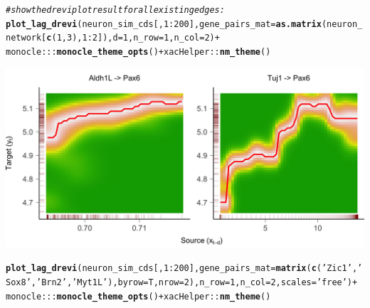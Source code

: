 \documentclass[10pt,oneside]{article}\usepackage[]{graphicx}\usepackage[]{color}
\makeatletter
\def\maxwidth{ %
  \ifdim\Gin@nat@width>\linewidth
    \linewidth
  \else
    \Gin@nat@width
  \fi
}
\newcommand{\hlnum}[1]{\textcolor[rgb]{0.686,0.059,0.569}{#1}}%
\newcommand{\hlstr}[1]{\textcolor[rgb]{0.192,0.494,0.8}{#1}}%
\newcommand{\hlcom}[1]{\textcolor[rgb]{0.678,0.584,0.686}{\textit{#1}}}%
\newcommand{\hlopt}[1]{\textcolor[rgb]{0,0,0}{#1}}%
\newcommand{\hlstd}[1]{\textcolor[rgb]{0.345,0.345,0.345}{#1}}%
\newcommand{\hlkwc}[1]{\textcolor[rgb]{0.333,0.667,0.333}{#1}}%
\newcommand{\hlkwd}[1]{\textcolor[rgb]{0.737,0.353,0.396}{\textbf{#1}}}%
\newenvironment{kframe}{%
 \def\at@end@of@kframe{}%
 \ifinner\ifhmode%
  \def\at@end@of@kframe{\end{minipage}}%
  \begin{minipage}{\columnwidth}%
 \fi\fi%
 \def\FrameCommand##1{\hskip\@totalleftmargin \hskip-\fboxsep
 \colorbox{shadecolor}{##1}\hskip-\fboxsep
     \hskip-\linewidth \hskip-\@totalleftmargin \hskip\columnwidth}%
 \MakeFramed {\advance\hsize-\width
   \@totalleftmargin\z@ \linewidth\hsize
   \@setminipage}}%
 {\par\unskip\endMakeFramed%
 \at@end@of@kframe}
\newenvironment{knitrout}{}{} %
\makeatother
\begin{document}
\begin{knitrout}
\color{fgcolor}\begin{kframe}
\begin{alltt}
\hlcom{# show the drevi plot result for all existing edges:}
\hlkwd{plot_lag_drevi}\hlstd{(neuron_sim_cds[,} \hlnum{1}\hlopt{:}\hlnum{200}\hlstd{],} \hlkwc{gene_pairs_mat} \hlstd{=} \hlkwd{as.matrix}\hlstd{(neuron_network[}\hlkwd{c}\hlstd{(}\hlnum{1}\hlstd{,} \hlnum{3}\hlstd{),} \hlnum{1}\hlopt{:}\hlnum{2}\hlstd{]),} \hlkwc{d} \hlstd{=} \hlnum{1}\hlstd{,} \hlkwc{n_row} \hlstd{=} \hlnum{1}\hlstd{,} \hlkwc{n_col} \hlstd{=} \hlnum{2}\hlstd{)} \hlopt{+}
  \hlstd{monocle}\hlopt{:::}\hlkwd{monocle_theme_opts}\hlstd{()} \hlopt{+} \hlstd{xacHelper}\hlopt{::}\hlkwd{nm_theme}\hlstd{()}
\end{alltt}
\end{kframe}

{\centering \includegraphics[width=\maxwidth]{figure/plot_drevi-1} 

}


\begin{kframe}\begin{alltt}
\hlkwd{plot_lag_drevi}\hlstd{(neuron_sim_cds[,} \hlnum{1}\hlopt{:}\hlnum{200}\hlstd{],} \hlkwc{gene_pairs_mat} \hlstd{=} \hlkwd{matrix}\hlstd{(}\hlkwd{c}\hlstd{(}\hlstr{'Zic1'}\hlstd{,} \hlstr{'Sox8'}\hlstd{,} \hlstr{'Brn2'}\hlstd{,} \hlstr{'Myt1L'}\hlstd{),} \hlkwc{byrow} \hlstd{= T,} \hlkwc{nrow} \hlstd{=} \hlnum{2}\hlstd{),} \hlkwc{n_row} \hlstd{=} \hlnum{1}\hlstd{,} \hlkwc{n_col} \hlstd{=} \hlnum{2}\hlstd{,} \hlkwc{scales} \hlstd{=} \hlstr{'free'}\hlstd{)} \hlopt{+}
  \hlstd{monocle}\hlopt{:::}\hlkwd{monocle_theme_opts}\hlstd{()} \hlopt{+} \hlstd{xacHelper}\hlopt{::}\hlkwd{nm_theme}\hlstd{()}
\end{alltt}
\end{kframe}


\end{knitrout}
\end{document}
